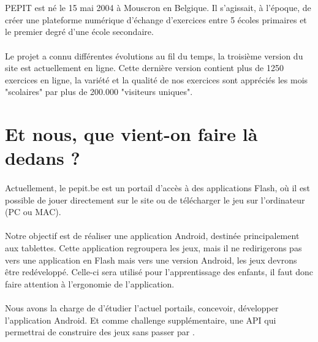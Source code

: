 \section{\pepit}
\paragraph{}PEPIT est né le 15 mai 2004 à Mouscron en Belgique. Il s'agissait, à l'époque, de créer une plateforme numérique d'échange d'exercices entre 5 écoles primaires et le premier degré d'une école secondaire.
\paragraph{}Le projet a connu différentes évolutions au fil du temps, la troisième version du site est actuellement en ligne. Cette dernière version contient plus de 1250 exercices en ligne, la variété et la qualité de nos exercices sont appréciés les mois "scolaires" par plus de 200.000 "visiteurs uniques".
\section{Et nous, que vient-on faire là dedans ?}
\paragraph{}Actuellement, le pepit.be est un portail d'accès à des applications Flash, où il est possible de jouer directement sur le site ou de télécharger le jeu sur l'ordinateur (PC ou MAC).
\paragraph{}Notre objectif est de réaliser une application Android, destinée principalement aux tablettes. Cette application regroupera les jeux, mais il ne redirigerons pas vers une application en Flash mais vers une version Android, les jeux devrons \^{e}tre redéveloppé. Celle-ci sera utilisé pour l'apprentissage des enfants, il faut donc faire attention à l'ergonomie de l'application.
\paragraph{}Nous avons la charge de d'étudier l'actuel portails, concevoir, développer l'application Android. Et comme challenge supplémentaire, une API qui permettrai de construire des jeux sans passer par \java{}.